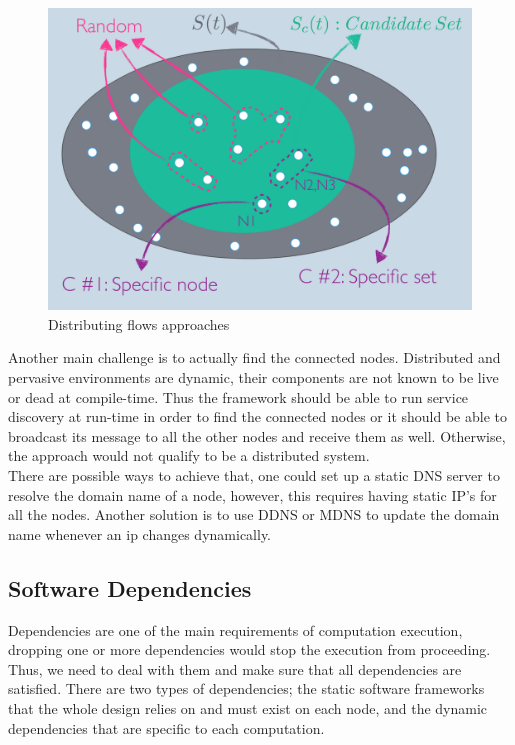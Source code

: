  \begin{figure}[H]
 	\centering
 	\includegraphics[scale=0.45]{images/set.png} 
 	\caption{Distributing flows approaches}
 	\label{fig:distributing-flows}
 \end{figure}

\noindent Another main challenge is to actually find the connected nodes. Distributed and pervasive environments are dynamic, their components are not known to be live or dead at compile-time. Thus the framework should be able to run service discovery at run-time in order to find the connected nodes or it should be able to broadcast its message to all the other nodes and receive them as well. Otherwise, the approach would not qualify to be a distributed system. \\

\noindent There are possible ways to achieve that, one could set up a static DNS server to resolve the domain name of a node, however, this requires having static IP's for all the nodes. Another solution is to use DDNS or MDNS to update the domain name whenever an ip changes dynamically.









\subsection{Software Dependencies}

Dependencies are one of the main requirements of computation execution, dropping one or more dependencies would stop the execution from proceeding. Thus, we need to deal with them and make sure that all dependencies are satisfied.  There are two types of dependencies; the static software frameworks that the whole design relies on and must exist on each node, and the dynamic dependencies that are specific to each computation. \\

